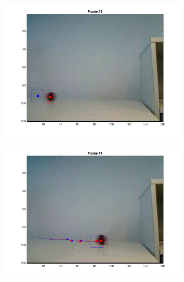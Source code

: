\documentclass{ethz_report}
\begin{document}
\begin{figure}[h]
    \centering
    \begin{subfigure}[b]{.25\textwidth}
        \centering
        \includegraphics[width=1\linewidth]{images/video3_observe_low_1}
    \end{subfigure}%
    \begin{subfigure}[b]{.25\textwidth}
        \centering
        \includegraphics[width=1\linewidth]{images/video3_observe_low_6}
    \end{subfigure}%
    \begin{subfigure}[b]{.25\textwidth}
        \centering

\end{subfigure}
\end{figure}
\end{document}
